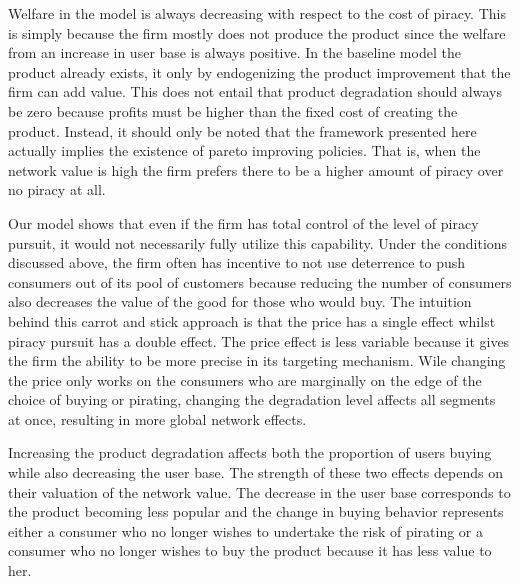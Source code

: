 Welfare in the model is always decreasing with respect to the cost of piracy. This is simply because the firm mostly does not produce the product since the welfare from an increase in user base is always positive. In the baseline model the product already exists, it only by endogenizing the product improvement that the firm can add value. This does not entail that product degradation should always be zero because profits must be higher than the fixed cost of creating the product. Instead, it should only be noted that the framework presented here actually implies the existence of pareto improving policies. That is, when the network value is high the firm prefers there to be a higher amount of piracy over no piracy at all. 


Our model shows that even if the firm has total control of the level of piracy pursuit, it would not necessarily fully utilize this capability. Under the conditions discussed above, the firm often has incentive to not use deterrence to push consumers out of its pool of customers because reducing the number of consumers also decreases the value of the good for those who would buy. The intuition behind this carrot and stick approach is that the price has a single effect whilst piracy pursuit has a double effect. The price effect is less variable because it gives the firm the ability to be more precise in its targeting mechanism. Wile changing the price only works on the consumers who are marginally on the edge of the choice of buying or pirating, changing the degradation level affects all segments at once, resulting in more global network effects. 

Increasing the product degradation affects both the proportion of users buying while also decreasing the user base. The strength of these two effects depends on their valuation of the network value. The decrease in the user base corresponds to the product becoming less popular and the change in buying behavior represents either a consumer who no longer wishes to undertake the risk of pirating or a consumer who no longer wishes to buy the product because it has less value to her.

